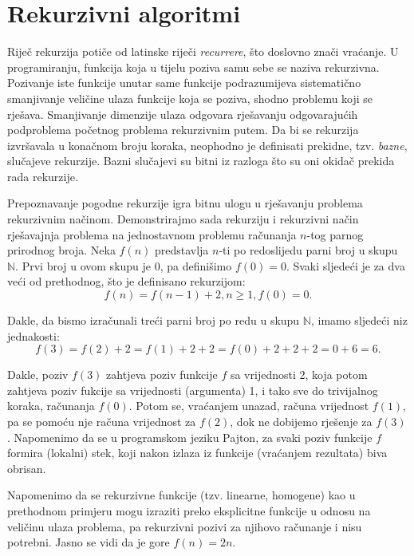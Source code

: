 \section{Rekurzivni algoritmi}
    
 Riječ rekurzija potiče od latinske riječi \textit{recurrere}, što doslovno znači vraćanje. U programiranju, funkcija koja u tijelu poziva samu sebe se naziva rekurzivna. Pozivanje iste funkcije unutar same funkcije podrazumijeva sistematično smanjivanje veličine ulaza funkcije koja se poziva,  shodno problemu koji se rješava. Smanjivanje dimenzije ulaza odgovara  rješavanju odgovarajućih podproblema početnog problema rekurzivnim putem. %
   Da bi se rekurzija izvršavala u konačnom broju koraka, neophodno je definisati prekidne, tzv. \textit{bazne}, slučajeve rekurzije. Bazni slučajevi su bitni iz razloga što su oni okidač prekida rada rekurzije. 
 
 Prepoznavanje pogodne rekurzije igra bitnu ulogu u rješavanju problema rekurzivnim načinom. Demonstrirajmo sada rekurziju i rekurzivni način rješavajnja problema na jednostavnom problemu računanja $n$-tog parnog prirodnog broja. Neka $f(n)$ predstavlja $n$-ti po redoslijedu parni broj u skupu $\mathbb{N}$. Prvi broj u ovom skupu je 0, pa definišimo $f(0)= 0$. Svaki sljedeći je za dva veći od prethodnog, %
 što je definisano rekurzijom: 
 $$f(n) = f(n-1) + 2, n \geq 1, f(0) = 0.$$
  
  Dakle, da bismo izračunali treći parni broj po redu u skupu $\mathbb{N}$, imamo sljedeći niz jednakosti:  
  $$f(3)= f(2) + 2 = f(1) + 2 + 2 = f(0) + 2 + 2 + 2 = 0 + 6 = 6.$$
 
 Dakle, poziv $f(3)$ zahtjeva poziv funkcije $f$ sa vrijednosti 2, koja potom zahtjeva poziv fukcije sa vrijednosti (argumenta) 1, i tako sve do trivijalnog koraka, računanja $f(0)$.  Potom se, vraćanjem unazad, računa vrijednost $f(1)$, pa se pomoću nje računa vrijednost za $f(2)$, dok ne dobijemo rješenje za $f(3)$. Napomenimo da se u programskom jeziku Pajton, za svaki poziv funkcije $f$ formira (lokalni) stek, koji nakon izlaza iz funkcije (vraćanjem rezultata) biva obrisan.  
 
Napomenimo da se rekurzivne funkcije (tzv. linearne, homogene) kao u prethodnom primjeru mogu izraziti preko eksplicitne funkcije u odnosu na veličinu ulaza problema, pa rekurzivni pozivi za njihovo  računanje i nisu potrebni. Jasno se vidi da je gore $f(n)=2n$. 
 
